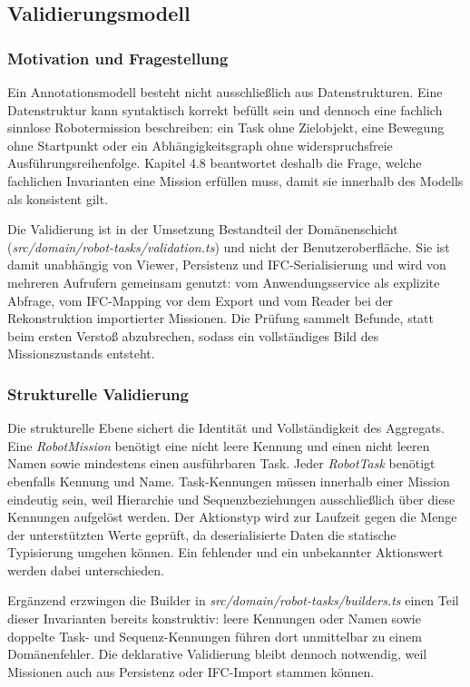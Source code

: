 \subsection{Validierungsmodell}
\subsubsection{Motivation und Fragestellung}
Ein Annotationsmodell besteht nicht ausschließlich aus Datenstrukturen. Eine Datenstruktur kann
syntaktisch korrekt befüllt sein und dennoch eine fachlich sinnlose Robotermission beschreiben: ein
Task ohne Zielobjekt, eine Bewegung ohne Startpunkt oder ein Abhängigkeitsgraph ohne
widerspruchsfreie Ausführungsreihenfolge. Kapitel 4.8 beantwortet deshalb die Frage, welche
fachlichen Invarianten eine Mission erfüllen muss, damit sie innerhalb des Modells als konsistent
gilt.

Die Validierung ist in der Umsetzung Bestandteil der Domänenschicht
(\textit{src/domain/robot-tasks/validation.ts}) und nicht der Benutzeroberfläche. Sie ist damit
unabhängig von Viewer, Persistenz und IFC-Serialisierung und wird von mehreren Aufrufern gemeinsam
genutzt: vom Anwendungsservice als explizite Abfrage, vom IFC-Mapping vor dem Export und vom Reader
bei der Rekonstruktion importierter Missionen. Die Prüfung sammelt Befunde, statt beim ersten
Verstoß abzubrechen, sodass ein vollständiges Bild des Missionszustands entsteht.

\subsubsection{Strukturelle Validierung}
Die strukturelle Ebene sichert die Identität und Vollständigkeit des Aggregats. Eine
\textit{RobotMission} benötigt eine nicht leere Kennung und einen nicht leeren Namen sowie
mindestens einen ausführbaren Task. Jeder \textit{RobotTask} benötigt ebenfalls Kennung und Name.
Task-Kennungen müssen innerhalb einer Mission eindeutig sein, weil Hierarchie und Sequenzbeziehungen
ausschließlich über diese Kennungen aufgelöst werden. Der Aktionstyp wird zur Laufzeit gegen die
Menge der unterstützten Werte geprüft, da deserialisierte Daten die statische Typisierung umgehen
können. Ein fehlender und ein unbekannter Aktionswert werden dabei unterschieden.

Ergänzend erzwingen die Builder in \textit{src/domain/robot-tasks/builders.ts} einen Teil dieser
Invarianten bereits konstruktiv: leere Kennungen oder Namen sowie doppelte Task- und
Sequenz-Kennungen führen dort unmittelbar zu einem Domänenfehler. Die deklarative Validierung bleibt
dennoch notwendig, weil Missionen auch aus Persistenz oder IFC-Import stammen können.

